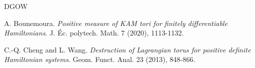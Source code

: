 \documentclass{amsart}
\newcounter{item}[section]
\theoremstyle{definition}
\begin{document}
\begin{thebibliography}{DGOW}
			
			 A. Bounemoura. {\it Positive measure of KAM tori for finitely differentiable Hamiltonians}.
			J. \'{E}c. polytech. Math. 7 (2020), 1113-1132.
			
			
			
			
			
			
			
			C.-Q. Cheng and L. Wang. {\it Destruction of Lagrangian torus for
				positive definite Hamiltonian systems}. Geom. Funct. Anal. {23} (2013), 848-866.
			
			
			
			
			
			

\end{thebibliography}
\end{document}
